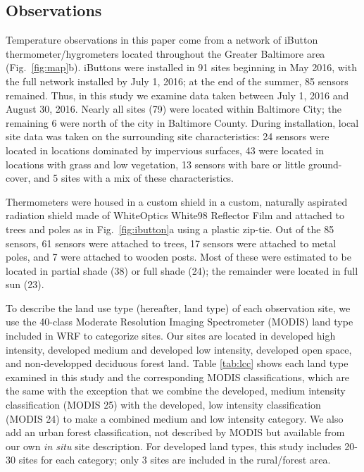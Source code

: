 \documentclass[draft,linenumbers]{agujournal}
\begin{document}
\subsection{Observations}
Temperature observations in this paper come from a network of iButton thermometer/hygrometers located throughout the Greater Baltimore area (Fig.~\ref{fig:map}b). 
iButtons were installed in 91 sites beginning in May 2016, with the full network installed by July 1, 2016; at the end of the summer, 85 sensors remained. Thus, in this study we examine data taken between July 1, 2016 and August 30, 2016. Nearly all sites (79) were located within Baltimore City; the remaining 6 were north of the city in Baltimore County. During installation, local site data was taken on the surrounding site characteristics: 24 sensors were located in locations dominated by impervious surfaces, 43 were located in locations with grass and low vegetation, 13 sensors with bare or little ground-cover, and 5 sites with a mix of these characteristics. 

Thermometers were housed in a custom shield in a custom, naturally aspirated radiation shield made of WhiteOptics White98 Reflector Film and attached to trees and poles as in Fig.~\ref{fig:ibutton}a using a plastic zip-tie. Out of the 85 sensors, 61 sensors were attached to trees, 17 sensors were attached to metal poles, and 7 were attached to wooden posts. Most of these were estimated to be located in partial shade (38) or full shade (24); the remainder were located in full sun (23). 

 To describe the land use type (hereafter, land type) of each observation site, we use the 40-class Moderate Resolution Imaging Spectrometer (MODIS) land type included in WRF to categorize sites. Our sites are located in developed high intensity, developed medium and developed low intensity, developed open space, and non-developped deciduous forest land.
 Table \ref{tab:lcc} shows each land type examined in this study and the corresponding MODIS classifications, which are the same with the exception that we combine the developed, medium intensity classification (MODIS 25) with the developed, low intensity classification (MODIS 24) to make a combined medium and low intensity category. We also add an urban forest classification, not described by MODIS but available from our own \textit{in situ} site description. 
For developed land types, this study includes 20-30 sites for each category; only 3 sites are included in the rural/forest area. 
\end{document}
